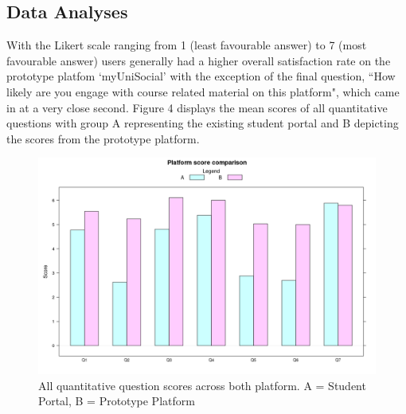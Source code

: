 \documentclass[lettersize,journal]{IEEEtran}
\begin{document}
	\subsection{Data Analyses}
		With the Likert scale ranging from 1 (least favourable answer) to 7 (most favourable answer) users generally had a higher overall satisfaction rate on the prototype platfom `myUniSocial'
		with the exception of the final question, ``How likely are you engage with course related material on this platform", which came in at a very close second. Figure 4 displays the mean scores
		of all quantitative questions with group A representing the existing student portal and B depicting the scores from the prototype platform.
	\begin{figure}[h!]
        		\includegraphics[width=\linewidth]{images/GroupedBarComparison.png}
        		\caption{All quantitative question scores across both platform. A = Student Portal, B = Prototype Platform}
        		\label{figure 4}
		\end{figure}
\end{document}
